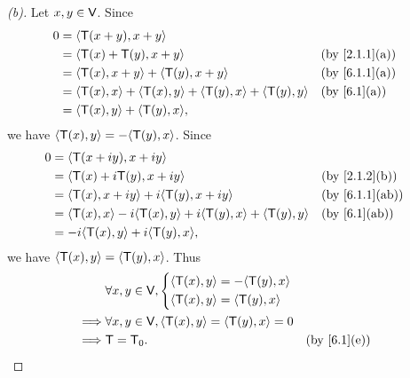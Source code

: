 \begin{proof}[(b)]
	Let \(x, y \in \mathsf{V}\).
	Since
	\begin{align*}
		0 & = \inn{\T(x + y), x + y}                                                               \\
		  & = \inn{\T(x) + \T(y), x + y}                                        &  & \by{2.1.1}[a] \\
		  & = \inn{\T(x), x + y} + \inn{\T(y), x + y}                           &  & \by{6.1.1}[a] \\
		  & = \inn{\T(x), x} + \inn{\T(x), y} + \inn{\T(y), x} + \inn{\T(y), y} &  & \by{6.1}[a]   \\
		  & = \inn{\T(x), y} + \inn{\T(y), x},
	\end{align*}
	we have \(\inn{\T(x), y} = - \inn{\T(y), x}\).
	Since
	\begin{align*}
		0 & = \inn{\T(x + iy), x + iy}                                                                  \\
		  & = \inn{\T(x) + i \T(y), x + iy}                                         &  & \by{2.1.2}[b]  \\
		  & = \inn{\T(x), x + iy} + i \inn{\T(y), x + iy}                           &  & \by{6.1.1}[ab] \\
		  & = \inn{\T(x), x} - i \inn{\T(x), y} + i \inn{\T(y), x} + \inn{\T(y), y} &  & \by{6.1}[ab]   \\
		  & = -i \inn{\T(x), y} + i \inn{\T(y), x},
	\end{align*}
	we have \(\left\langle\mathsf{T}(x), y\right\rangle = \left\langle\mathsf{T}(y), x\right\rangle\).
	Thus
	\begin{align*}
		         & \forall x, y \in \V, \begin{dcases}
			                                \inn{\T(x), y} = - \inn{\T(y), x} \\
			                                \inn{\T(x), y} = \inn{\T(y), x}
		                                \end{dcases}                    \\
		\implies & \forall x, y \in \V, \inn{\T(x), y} = \inn{\T(y), x} = 0                  \\
		\implies & \T = \zT.                                                &  & \by{6.1}[e]
	\end{align*}
\end{proof}

